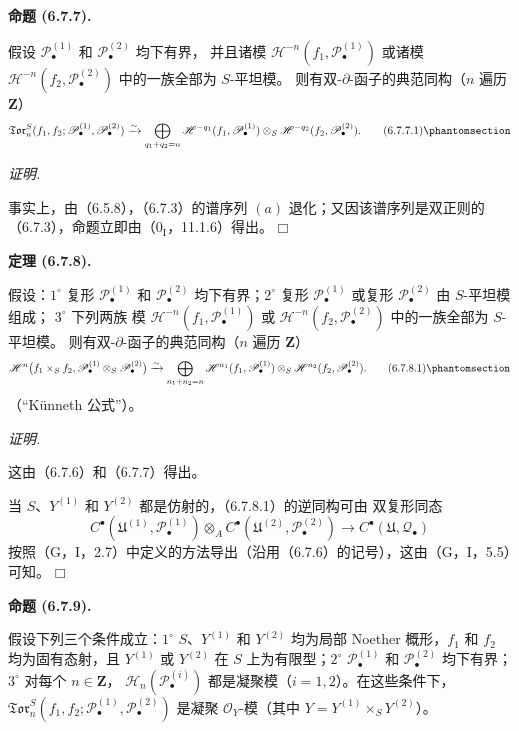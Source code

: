 \documentclass[UTF8,fontset=none,11pt,oneside,openany]{ctexbook}
\providecommand{\square}{\mdlgwhtsquare}
\newenvironment{theorem}[1][]{%
  \par\medskip\noindent\textbf{定理 (#1).}\ %
}{\par}
\newenvironment{proposition}[1][]{%
  \par\medskip\noindent\textbf{命题 (#1).}\ %
}{\par}
\newenvironment{proof}{%
  \par\smallskip\noindent\textit{证明.}\ %
}{\hfill$\square$\par}
\newcommand{\oldpage}[2][]{%
  \hypertarget{ega-source-page-#1-#2}{}%
  \marginnote{\scriptsize\textbf{#1}~|~#2}\ignorespaces}
\let\EGAOriginalLabel\label
\renewcommand{\label}[1]{\phantomsection\EGAOriginalLabel{#1}}
\begin{document}
\begin{proposition}[6.7.7]
假设 $\mathscr P_\bullet^{(1)}$ 和 $\mathscr P_\bullet^{(2)}$ 均下有界，
并且诸模 $\mathscr H^{-n}(f_1,\mathscr P_\bullet^{(1)})$ 或诸模
$\mathscr H^{-n}(f_2,\mathscr P_\bullet^{(2)})$ 中的一族全部为 $S$-平坦模。
则有双-$\partial$-函子的典范同构（$n$ 遍历 $\mathbf Z$）
\[
  \mathfrak{Tor}_n^S
  (f_1,f_2;\mathscr P_\bullet^{(1)},\mathscr P_\bullet^{(2)})
  \xrightarrow{\sim}
  \bigoplus_{q_1+q_2=n}
  \mathscr H^{-q_1}(f_1,\mathscr P_\bullet^{(1)})
  \otimes_S
  \mathscr H^{-q_2}(f_2,\mathscr P_\bullet^{(2)}).
  \tag{6.7.7.1}\label{III.6.7.7.1.fr}
\]
\end{proposition}

\begin{proof}
事实上，由（6.5.8），（6.7.3）的谱序列 $(a)$ 退化；又因该谱序列是双正则的
（6.7.3），命题立即由（$0_{\mathrm I}$，11.1.6）得出。
\end{proof}

\begin{theorem}[6.7.8]
假设：$1^\circ$ 复形 $\mathscr P_\bullet^{(1)}$ 和
$\mathscr P_\bullet^{(2)}$ 均下有界；$2^\circ$ 复形
$\mathscr P_\bullet^{(1)}$ 或复形 $\mathscr P_\bullet^{(2)}$ 由 $S$-平坦模组成；
$3^\circ$ 下列两族
\oldpage[III]{162}
模 $\mathscr H^{-n}(f_1,\mathscr P_\bullet^{(1)})$ 或
$\mathscr H^{-n}(f_2,\mathscr P_\bullet^{(2)})$ 中的一族全部为 $S$-平坦模。
则有双-$\partial$-函子的典范同构（$n$ 遍历 $\mathbf Z$）
\[
  \mathscr H^n\bigl(f_1\times_S f_2,
    \mathscr P_\bullet^{(1)}\otimes_S\mathscr P_\bullet^{(2)}\bigr)
  \xrightarrow{\sim}
  \bigoplus_{n_1+n_2=n}
  \mathscr H^{n_1}(f_1,\mathscr P_\bullet^{(1)})
  \otimes_S
  \mathscr H^{n_2}(f_2,\mathscr P_\bullet^{(2)}).
  \tag{6.7.8.1}\label{III.6.7.8.1.fr}
\]
（“Künneth 公式”）。
\end{theorem}

\begin{proof}
这由（6.7.6）和（6.7.7）得出。

当 $S$、$Y^{(1)}$ 和 $Y^{(2)}$ 都是仿射的，（6.7.8.1）的逆同构可由
双复形同态
\[
  C^\bullet(\mathfrak U^{(1)},\mathscr P_\bullet^{(1)})
  \otimes_A
  C^\bullet(\mathfrak U^{(2)},\mathscr P_\bullet^{(2)})
  \longrightarrow
  C^\bullet(\mathfrak U,\mathscr Q_\bullet)
\]
按照（G，I，2.7）中定义的方法导出（沿用（6.7.6）的记号），这由（G，I，5.5）可知。
\end{proof}

\begin{proposition}[6.7.9]
假设下列三个条件成立：$1^\circ$ $S$、$Y^{(1)}$ 和 $Y^{(2)}$ 均为局部
Noether 概形，$f_1$ 和 $f_2$ 均为固有态射，且 $Y^{(1)}$ 或 $Y^{(2)}$
在 $S$ 上为有限型；$2^\circ$ $\mathscr P_\bullet^{(1)}$ 和
$\mathscr P_\bullet^{(2)}$ 均下有界；$3^\circ$ 对每个 $n\in\mathbf Z$，
$\mathscr H_n(\mathscr P_\bullet^{(i)})$ 都是凝聚模（$i=1,2$）。在这些条件下，
$\mathfrak{Tor}_n^S
(f_1,f_2;\mathscr P_\bullet^{(1)},\mathscr P_\bullet^{(2)})$ 是凝聚
$\mathscr O_Y$-模（其中 $Y=Y^{(1)}\times_S Y^{(2)}$）。
\end{proposition}
\end{document}
